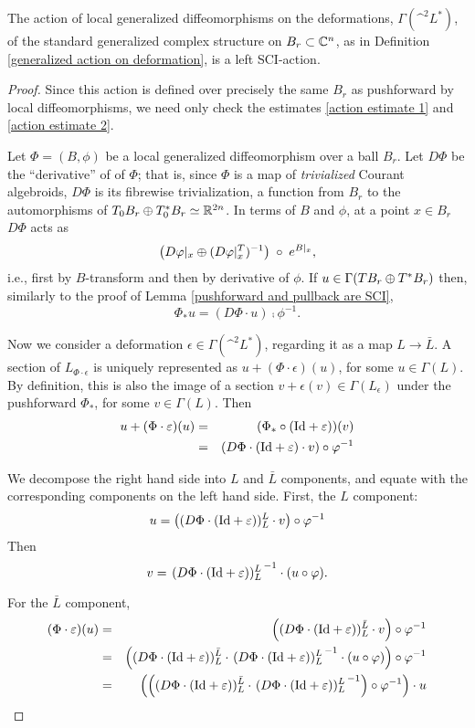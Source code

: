 \documentclass{article}
\begin{document}
\begin{lem}
The action of local generalized diffeomorphisms on the deformations, $\Gamma(\^ ^2 L^*)$, of the standard generalized complex structure on $B_r \subset \mathbb C^n$, as in Definition \ref{generalized action on deformation}, is a left SCI-action.
\end{lem}
\begin{proof}
Since this action is defined over precisely the same $B_r$ as pushforward by local diffeomorphisms, we need only check the estimates \eqref{action estimate 1} and \eqref{action estimate 2}.

Let $\Phi=(B,\phi)$ be a local generalized diffeomorphism over a ball $B_r$.  Let $D\Phi$ be the ``derivative'' of of $\Phi$; that is, since $\Phi$ is a map of \emph{trivialized} Courant algebroids, $D\Phi$ is its fibrewise trivialization, a function from $B_r$ to the automorphisms of $T_0 B_r \oplus T^*_0 B_r \simeq \mathbb R^{2n}$.  In terms of $B$ and $\phi$, at a point $x \in B_r$ $D\Phi$ acts as
$$\left(D\varphi|_x \oplus (D\varphi|_x^T)^{-1}\right) \;\circ\; e^{B|_x},$$
i.e., first by $B$-transform and then by derivative of $\phi$.  If $u \in \Gamma(TB_r \oplus T^*B_r)$ then, similarly to the proof of Lemma \ref{pushforward and pullback are SCI},
$$\Phi_* u = (D\Phi\cdot u) \comp\phi^{-1}.$$

Now we consider a deformation $\epsilon \in \Gamma(\^ ^2 L^*)$, regarding it as a map $L \to \bar{L}$.  A section of $L_{\Phi\cdot\epsilon}$ is uniquely represented as $u + (\Phi\cdot\epsilon)(u)$, for some $u \in \Gamma(L)$.  By definition, this is also the image of a section $v + \epsilon(v) \in \Gamma(L_\epsilon)$ under the pushforward $\Phi_*$, for some $v \in \Gamma(L)$.  Then
\begin{eqnarray*}
u + (\Phi\cdot\varepsilon)(u) &=& (\Phi_*\circ(\textrm{Id}+\varepsilon))(v) \\
&=& (D\Phi\cdot(\textrm{Id}+\varepsilon)\cdot v) \circ \varphi^{-1}
\end{eqnarray*}

We decompose the right hand side into $L$ and $\bar{L}$ components, and equate with the corresponding components on the left hand side.  First, the $L$ component:
$$u = \left( (D\Phi\cdot(\textrm{Id}+\varepsilon))^L_L \cdot v\right) \circ \varphi^{-1}$$
Then
$$v = \left. (D\Phi\cdot(\textrm{Id}+\varepsilon))^L_L \right.^{-1} \cdot (u\circ\varphi).$$

For the $\bar{L}$ component,
\begin{eqnarray}
(\Phi\cdot\epsilon)(u) &=& \left((D\Phi\cdot(\Id+\epsilon))^{\bar{L}}_L \cdot v \right) \comp \phi^{-1} \notag \\
&=& \left((D\Phi\cdot(\Id+\epsilon))^{\bar{L}}_L \cdot \left. (D\Phi\cdot(\Id+\epsilon))^L_L \right.^{-1} \cdot (u\comp\phi) \right) \comp \phi^{-1} \notag \\
&=& \left(\left((D\Phi\cdot(\Id+\epsilon))^{\bar{L}}_L \cdot \left. (D\Phi\cdot(\Id+\epsilon))^L_L \right.^{-1}\right) \comp \phi^{-1}\right) \cdot u \label{action formula}
\end{eqnarray}


\end{proof}
\end{document}
